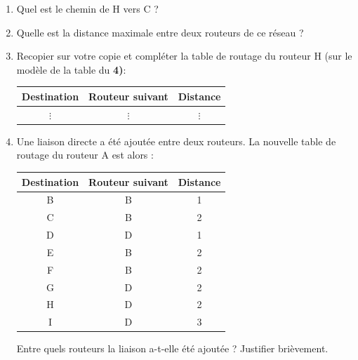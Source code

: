 \documentclass[11pt,a4paper,french,twoside]{PMCours}
\begin{document}
\begin{enumerate}
    \item Quel est le chemin de H vers C ?
    \item Quelle est la distance maximale entre deux routeurs de ce réseau ? 
    \item Recopier sur votre copie et compléter la table de routage du routeur H (sur le modèle de la table du {\bf 4)}:
    \begin{center}
        \begin{tabular}{|c|c|c|}\hline
            Destination&Routeur suivant&Distance\\ \hline
            $\vdots$ &$\vdots$&$\vdots$\\ \hline
            
        \end{tabular}
    \end{center}
    \item Une liaison directe a été ajoutée entre deux routeurs.
    La nouvelle table de routage du routeur A est alors :
    \begin{center}
        \begin{tabular}{|c|c|c|}\hline
            Destination&Routeur suivant&Distance\\ \hline
            B&B &1 \\ \hline 
            C&B &2 \\ \hline 
            D&D &1 \\ \hline 
            E&B &2 \\ \hline 
            F&B &2 \\ \hline  
            G&D &2 \\ \hline 
            H&D &2 \\ \hline
            I&D &3 \\ \hline
 \end{tabular}
    \end{center}
    Entre quels routeurs la liaison a-t-elle été ajoutée ? Justifier brièvement.
\end{enumerate}

\newpage
\end{document}
